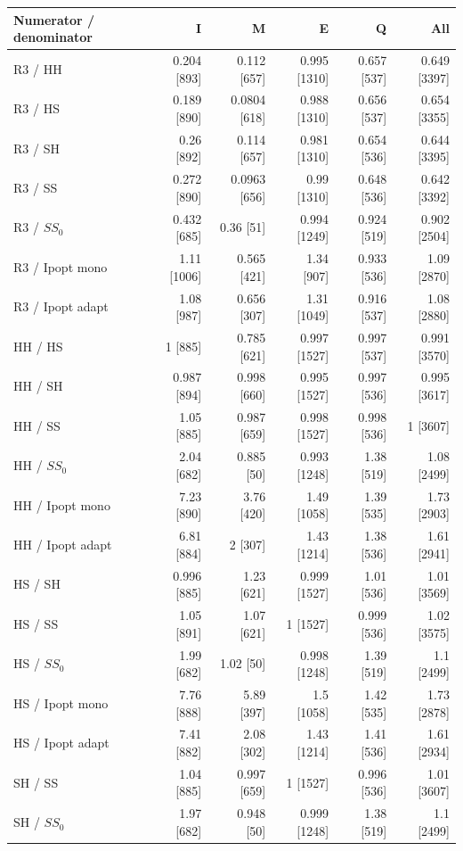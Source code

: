 \begin{tabular}{@{}lrrrrr@{}}
\toprule
Numerator / denominator & I & M & E & Q & All \\
\midrule
R3 / HH & 0.204 [893] & 0.112 [657] & 0.995 [1310] & 0.657 [537] & 0.649 [3397] \\
R3 / HS & 0.189 [890] & 0.0804 [618] & 0.988 [1310] & 0.656 [537] & 0.654 [3355] \\
R3 / SH & 0.26 [892] & 0.114 [657] & 0.981 [1310] & 0.654 [536] & 0.644 [3395] \\
R3 / SS & 0.272 [890] & 0.0963 [656] & 0.99 [1310] & 0.648 [536] & 0.642 [3392] \\
R3 / $SS_0$ & 0.432 [685] & 0.36 [51] & 0.994 [1249] & 0.924 [519] & 0.902 [2504] \\
R3 / Ipopt mono & 1.11 [1006] & 0.565 [421] & 1.34 [907] & 0.933 [536] & 1.09 [2870] \\
R3 / Ipopt adapt & 1.08 [987] & 0.656 [307] & 1.31 [1049] & 0.916 [537] & 1.08 [2880] \\
HH / HS & 1 [885] & 0.785 [621] & 0.997 [1527] & 0.997 [537] & 0.991 [3570] \\
HH / SH & 0.987 [894] & 0.998 [660] & 0.995 [1527] & 0.997 [536] & 0.995 [3617] \\
HH / SS & 1.05 [885] & 0.987 [659] & 0.998 [1527] & 0.998 [536] & 1 [3607] \\
HH / $SS_0$ & 2.04 [682] & 0.885 [50] & 0.993 [1248] & 1.38 [519] & 1.08 [2499] \\
HH / Ipopt mono & 7.23 [890] & 3.76 [420] & 1.49 [1058] & 1.39 [535] & 1.73 [2903] \\
HH / Ipopt adapt & 6.81 [884] & 2 [307] & 1.43 [1214] & 1.38 [536] & 1.61 [2941] \\
HS / SH & 0.996 [885] & 1.23 [621] & 0.999 [1527] & 1.01 [536] & 1.01 [3569] \\
HS / SS & 1.05 [891] & 1.07 [621] & 1 [1527] & 0.999 [536] & 1.02 [3575] \\
HS / $SS_0$ & 1.99 [682] & 1.02 [50] & 0.998 [1248] & 1.39 [519] & 1.1 [2499] \\
HS / Ipopt mono & 7.76 [888] & 5.89 [397] & 1.5 [1058] & 1.42 [535] & 1.73 [2878] \\
HS / Ipopt adapt & 7.41 [882] & 2.08 [302] & 1.43 [1214] & 1.41 [536] & 1.61 [2934] \\
SH / SS & 1.04 [885] & 0.997 [659] & 1 [1527] & 0.996 [536] & 1.01 [3607] \\
SH / $SS_0$ & 1.97 [682] & 0.948 [50] & 0.999 [1248] & 1.38 [519] & 1.1 [2499] \\

\end{tabular}
